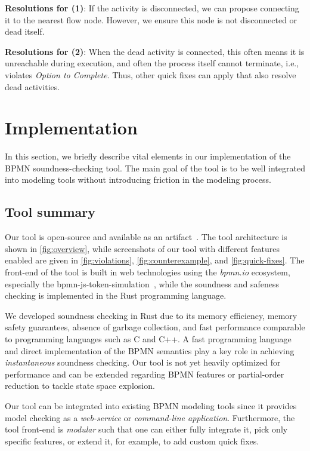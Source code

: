 \documentclass[runningheads]{llncs}
\begin{document}
\textbf{Resolutions for (1)}: If the activity is disconnected, we can propose connecting it to the nearest flow node.
However, we ensure this node is not disconnected or dead itself.

\textbf{Resolutions for (2)}: When the dead activity is connected, this often means it is unreachable during execution, and often the process itself cannot terminate, i.e., violates \textit{Option to Complete}.
Thus, other quick fixes can apply that also resolve dead activities.

\section{Implementation} \label{sec:impl}

In this section, we briefly describe vital elements in our implementation of the BPMN soundness-checking tool.
The main goal of the tool is to be well integrated into modeling tools without introducing friction in the modeling process.

\subsection{Tool summary}
Our tool is open-source and available as an artifact~\cite{noauthorgivenBPM2024Artifacts2024}.
The tool architecture is shown in \autoref{fig:overview}, while screenshots of our tool with different features enabled are given in \autoref{fig:violations}, \autoref{fig:counterexample}, and \autoref{fig:quick-fixes}.
The front-end of the tool is built in web technologies using the \textit{bpmn.io} ecosystem, especially the bpmn-js-token-simulation~\cite{camundaservicesgmbhBpmnjsTokenSimulation2024}, while the soundness and safeness checking is implemented in the Rust programming language.

We developed soundness checking in Rust due to its memory efficiency, memory safety guarantees, absence of garbage collection, and fast performance comparable to programming languages such as C and C++.
A fast programming language and direct implementation of the BPMN semantics play a key role in achieving \textit{instantaneous} soundness checking.
Our tool is not yet heavily optimized for performance and can be extended regarding BPMN features or partial-order reduction to tackle state space explosion.

Our tool can be integrated into existing BPMN modeling tools since it provides model checking as a \textit{web-service} or \textit{command-line application}.
Furthermore, the tool front-end is \textit{modular} such that one can either fully integrate it, pick only specific features, or extend it, for example, to add custom quick fixes.
\end{document}
